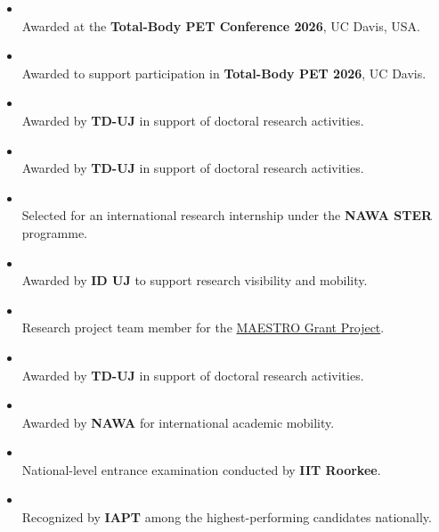 \noindent {}
\begin{itemize}
    \item {} \\
    Awarded at the \textbf{Total-Body PET Conference 2026}, UC Davis, USA.

    \item {} \\
    Awarded to support participation in \textbf{Total-Body PET 2026}, UC Davis.

    \item {} \\
    Awarded by \textbf{TD-UJ} in support of doctoral research activities.

    \item {} \\
    Awarded by \textbf{TD-UJ} in support of doctoral research activities.

    \item {} \\
    Selected for an international research internship under the \textbf{NAWA STER} programme.

    \item {} \\
    Awarded by \textbf{ID UJ} to support research visibility and mobility.

    \item {} \\
    Research project team member for the \href{https://koza.if.uj.edu.pl/maestro/presentations.php}{MAESTRO Grant Project}.

    \item {} \\
    Awarded by \textbf{TD-UJ} in support of doctoral research activities.

    \item {} \\
    Awarded by \textbf{NAWA} for international academic mobility.

    \item {} \\
    National-level entrance examination conducted by \textbf{IIT Roorkee}.

    \item {} \\
    Recognized by \textbf{IAPT} among the highest-performing candidates nationally.
\end{itemize}